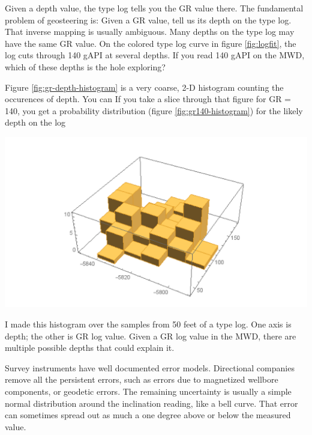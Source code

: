 \documentclass{tufte-handout}
\begin{document}
Given a depth value, the type log tells you the GR value there.  The fundamental problem of geosteering is: Given a GR value, tell us its depth on the type log. That inverse mapping is usually ambiguous. Many depths on the type log may have the same GR value. On the colored type log curve in  figure \ref{fig:logfit}, the log cuts through 140 gAPI at several depths. If you read 140 gAPI on the MWD, which of these depths is the hole exploring? 

Figure \ref{fig:gr-depth-histogram} is a very coarse, 2-D histogram counting the occurences of depth.
You can
If you take a slice through that figure for GR = 140, you get a probability distribution (figure \ref{fig:gr140-histogram}) 
for the likely depth on the log


\begin{marginfigure}
  \includegraphics{gr-depth-histogram}
  \caption{I made this histogram over the samples from 50 feet of 
  a type log. One axis is depth; the other is GR log value.
  Given a GR log value in the MWD, there are multiple possible depths
  that could explain it. }
  \label{fig:gr-depth-histogram}
\end{marginfigure}


Survey instruments have well documented error models. Directional companies remove all the persistent errors, such as errors due to magnetized wellbore components, or geodetic errors. The remaining uncertainty is usually a simple normal distribution around the inclination reading, like a bell curve. That error can sometimes spread out as much a one degree above or below the measured value. 
\end{document}
